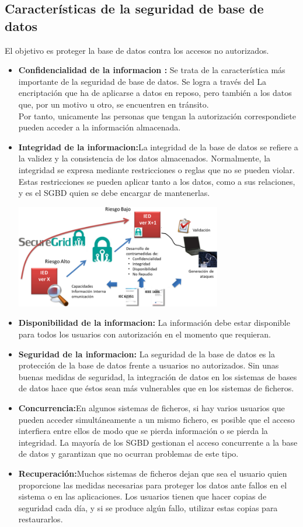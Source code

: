 \documentclass[%
 reprint,
 amsmath,amssymb,
 aps,
]{revtex4-1}
\begin{document}
\subsection{Características de la seguridad de base de datos}
El objetivo es proteger la base de datos contra los accesos no autorizados.
\begin{itemize}
\item \textbf{Confidencialidad de la informacion :} Se trata de la característica más importante de la seguridad de base de datos. Se logra a través del La encriptación que ha de aplicarse a datos en reposo, pero también a los datos que, por un motivo u otro, se encuentren en tránsito. \\ Por tanto, unicamente las personas que tengan la autorización correspondiete pueden acceder a la información almacenada.
\item \textbf{Integridad de la informacion:}La integridad de la base de datos se refiere a la validez y la consistencia de los datos almacenados. Normalmente, la integridad se expresa mediante restricciones o reglas que no se pueden violar. Estas restricciones se pueden aplicar tanto a los datos, como a sus relaciones, y es el SGBD quien se debe encargar de mantenerlas.
\begin{center}
	\includegraphics[width=9cm]{./Imagenes/integridad}
\end{center}	
\item \textbf{Disponibilidad de la informacion:} La información debe estar disponible para todos los usuarios con autorización en el momento que requieran.
\item \textbf{Seguridad de la informacion:} La seguridad de la base de datos es la protección de la base de datos frente a usuarios no autorizados. Sin unas buenas medidas de seguridad, la integración de datos en los sistemas de bases de datos hace que éstos sean más vulnerables que en los sistemas de ficheros.
\item \textbf{Concurrencia:}En algunos sistemas de ficheros, si hay varios usuarios que pueden acceder simultáneamente a un mismo fichero, es posible que el acceso interfiera entre ellos de modo que se pierda información o se pierda la integridad. La mayoría de los SGBD gestionan el acceso concurrente a la base de datos y garantizan que no ocurran problemas de este tipo.
\item \textbf{Recuperación:}Muchos sistemas de ficheros dejan que sea el usuario quien proporcione las medidas necesarias para proteger los datos ante fallos en el sistema o en las aplicaciones. Los usuarios tienen que hacer copias de seguridad cada día, y si se produce algún fallo, utilizar estas copias para restaurarlos. \cite{web1}

\end{itemize}
\end{document}
